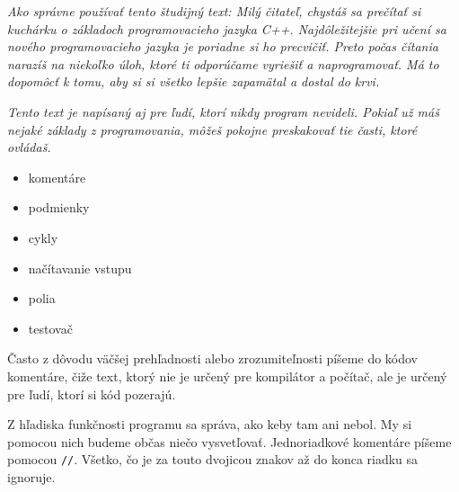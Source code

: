 




\textit{Ako správne používať tento študijný text: Milý čitateľ, chystáš sa
prečítať si kuchárku o základoch programovacieho jazyka C++. Najdôležitejšie
pri učení sa nového programovacieho jazyka je poriadne si ho precvičiť. Preto
počas čítania narazíš na niekoľko úloh, ktoré ti odporúčame vyriešiť a
naprogramovať.  Má to dopomôcť k tomu, aby si si všetko lepšie zapamätal a dostal
do krvi.}

\textit{Tento text je napísaný aj pre ľudí, ktorí nikdy program nevideli. Pokiaľ
už máš nejaké základy z programovania, môžeš pokojne preskakovať tie časti,
ktoré ovládaš.}

\begin{itemize}
    \vspace{-8pt}
    \item komentáre
    \vspace{-5pt}
    \item podmienky
    \vspace{-5pt}
    \item cykly 
    \vspace{-5pt}
    \item načítavanie vstupu
    \vspace{-5pt}
    \item polia
    \vspace{-5pt}
    \item testovač
\end{itemize}

\medskip


Často z dôvodu väčšej prehľadnosti alebo zrozumiteľnosti píšeme do kódov komentáre,  
čiže text, ktorý nie je určený pre kompilátor a počítač, ale je určený pre ľudí,
ktorí si kód pozerajú. 

Z hľadiska funkčnosti programu sa správa, ako keby tam ani nebol.
My si pomocou nich budeme občas niečo vysvetľovať. 
Jednoriadkové komentáre píšeme pomocou \verb!//!. Všetko, čo je za touto dvojicou
znakov až do konca riadku sa ignoruje.

